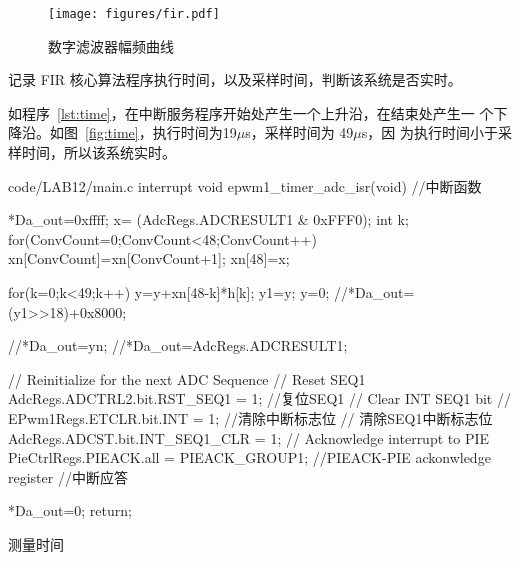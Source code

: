 \documentclass[../main]{subfiles}
\begin{document}
\begin{figure}[htbp]
  \centering
  \texttt{[image: figures/fir.pdf]}
  \caption{数字滤波器幅频曲线}%
  \label{fig:fir}
\end{figure}

\begin{Exercise}
  记录 FIR 核心算法程序执行时间，以及采样时间，判断该系统是否实时。
\end{Exercise}

\begin{Answer}
  如程序~\ref{lst:time}，在中断服务程序开始处产生一个上升沿，在结束处产生一
  个下降沿。如图~\ref{fig:time}，执行时间为19$\mu$s，采样时间为 49$\mu$s，因
  为执行时间小于采样时间，所以该系统实时。
\end{Answer}

\newpage

\begin{listing}
  \centering
\begin{langPyOne}[matlab][firstnumber = 360]{code/LAB12/main.c}
interrupt void epwm1_timer_adc_isr(void)    //中断函数
{
	 *Da_out=0xffff;
   x= (AdcRegs.ADCRESULT1 & 0xFFF0);
	 int k;
	 for(ConvCount=0;ConvCount<48;ConvCount++)
      xn[ConvCount]=xn[ConvCount+1];
	 xn[48]=x;

	 for(k=0;k<49;k++)
      y=y+xn[48-k]*h[k];
	 y1=y;
	 y=0;
	 //*Da_out=(y1>>18)+0x8000;

	//*Da_out=yn;
  //*Da_out=AdcRegs.ADCRESULT1;

// Reinitialize for the next ADC Sequence
// Reset SEQ1
   AdcRegs.ADCTRL2.bit.RST_SEQ1 = 1;       //复位SEQ1
// Clear INT SEQ1 bit
// EPwm1Regs.ETCLR.bit.INT = 1;           //清除中断标志位
// 清除SEQ1中断标志位
   AdcRegs.ADCST.bit.INT_SEQ1_CLR = 1;
// Acknowledge interrupt to PIE
   PieCtrlRegs.PIEACK.all = PIEACK_GROUP1; //PIEACK-PIE ackonwledge register   //中断应答

   *Da_out=0;
   return;
}
\end{langPyOne}
  \caption{测量时间}%
  \label{lst:time}
\end{listing}
\end{document}

